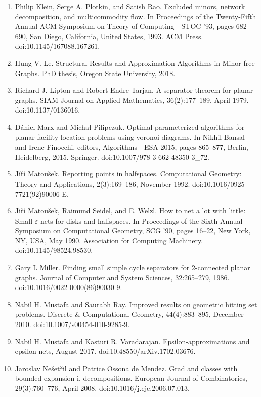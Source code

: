 \documentclass[10pt,a4paper]{article}
\begin{document}
\begin{enumerate}
\item[]  [41]  Philip Klein, Serge A. Plotkin, and Satish Rao.  Excluded minors, network decomposition, and multicommodity flow.  In Proceedings of the Twenty-Fifth Annual ACM Symposium on Theory of Computing - STOC ’93, pages 682–690, San Diego, California, United States, 1993. ACM Press.  doi:10.1145/167088.167261.  
\item[]  [42]  Hung V. Le.  Structural Results and Approximation Algorithms in Minor-free Graphs.  PhD thesis, Oregon State University, 2018.  
\item[]  [43]  Richard J. Lipton and Robert Endre Tarjan.  A separator theorem for planar graphs.  SIAM Journal on Applied Mathematics, 36(2):177–189, April 1979.  doi:10.1137/0136016.  
\item[]  [44]  Dániel Marx and Michał Pilipczuk.  Optimal parameterized algorithms for planar facility location problems using voronoi diagrams.  In Nikhil Bansal and Irene Finocchi, editors, Algorithms - ESA 2015, pages 865–877, Berlin, Heidelberg, 2015. Springer.  doi:10.1007/978-3-662-48350-3\_72.  
\item[]  [45]  Jir̆í Matous̆ek.  Reporting points in halfspaces.  Computational Geometry: Theory and Applications, 2(3):169–186, November 1992.  doi:10.1016/0925-7721(92)90006-E.  
\item[]  [46]  Jiří Matoušek, Raimund Seidel, and E. Welzl.  How to net a lot with little: Small $\varepsilon$-nets for disks and halfspaces.  In Proceedings of the Sixth Annual Symposium on Computational Geometry, SCG ’90, pages 16–22, New York, NY, USA, May 1990. Association for Computing Machinery.  doi:10.1145/98524.98530.  
\item[]  [47]  Gary L Miller.  Finding small simple cycle separators for 2-connected planar graphs.  Journal of Computer and System Sciences, 32:265–279, 1986.  doi:10.1016/0022-0000(86)90030-9.  
\item[]  [48]  Nabil H. Mustafa and Saurabh Ray.  Improved results on geometric hitting set problems.  Discrete \& Computational Geometry, 44(4):883–895, December 2010.  doi:10.1007/s00454-010-9285-9.  
\item[]  [49]  Nabil H. Mustafa and Kasturi R. Varadarajan.  Epsilon-approximations and epsilon-nets, August 2017.  doi:10.48550/arXiv.1702.03676.  
\item[]  [50]  Jaroslav Nešetřil and Patrice Ossona de Mendez.  Grad and classes with bounded expansion i. decompositions.  European Journal of Combinatorics, 29(3):760–776, April 2008.  doi:10.1016/j.ejc.2006.07.013.  

\end{enumerate}
\end{document}
